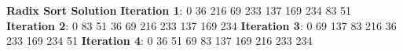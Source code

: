 \documentclass{article}
\begin{document}
\textbf{Radix Sort Solution}
\textbf{Iteration 1}: 0 36 216 69 233 137 169 234 83 51 \newline
\textbf{Iteration 2}: 0 83 51 36 69 216 233 137 169 234 \newline
\textbf{Iteration 3}: 0 69 137 83 216 36 233 169 234 51 \newline
\textbf{Iteration 4}: 0 36 51 69 83 137 169 216 233 234 \newline
\end{document}
